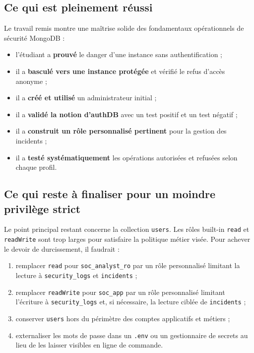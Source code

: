 \documentclass[11pt,a4paper]{article}
\begin{document}
\subsection{Ce qui est pleinement réussi}

Le travail remis montre une maîtrise solide des fondamentaux opérationnels de sécurité MongoDB :
\begin{itemize}
  \item l'étudiant a \textbf{prouvé} le danger d'une instance sans authentification ;
  \item il a \textbf{basculé vers une instance protégée} et vérifié le refus d'accès anonyme ;
  \item il a \textbf{créé et utilisé} un administrateur initial ;
  \item il a \textbf{validé la notion d'authDB} avec un test positif et un test négatif ;
  \item il a \textbf{construit un rôle personnalisé pertinent} pour la gestion des incidents ;
  \item il a \textbf{testé systématiquement} les opérations autorisées et refusées selon chaque profil.
\end{itemize}

\subsection{Ce qui reste à finaliser pour un moindre privilège strict}

Le point principal restant concerne la collection \texttt{users}. Les rôles built-in \texttt{read} et \texttt{readWrite} sont trop larges pour satisfaire la politique métier visée. Pour achever le devoir de durcissement, il faudrait :
\begin{enumerate}
  \item remplacer \texttt{read} pour \texttt{soc\_analyst\_ro} par un rôle personnalisé limitant la lecture à \texttt{security\_logs} et \texttt{incidents} ;
  \item remplacer \texttt{readWrite} pour \texttt{soc\_app} par un rôle personnalisé limitant l'écriture à \texttt{security\_logs} et, si nécessaire, la lecture ciblée de \texttt{incidents} ;
  \item conserver \texttt{users} hors du périmètre des comptes applicatifs et métiers ;
  \item externaliser les mots de passe dans un \texttt{.env} ou un gestionnaire de secrets au lieu de les laisser visibles en ligne de commande.
\end{enumerate}
\end{document}
